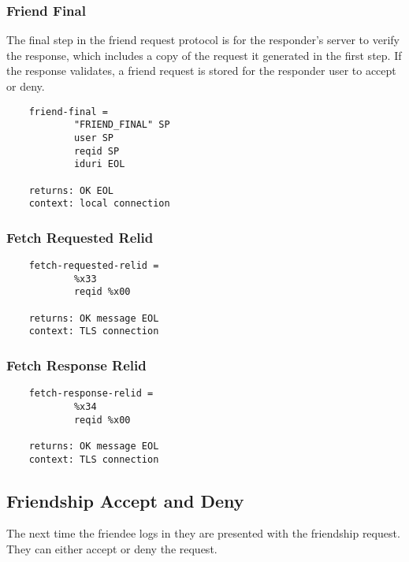 \documentclass[letterpaper,11pt,oneside]{article}
\begin{document}
\subsubsection{Friend Final}

The final step in the friend request protocol is for the responder's server to
verify the response, which includes a copy of the request it generated in the
first step. If the response validates, a friend request is stored for the
responder user to accept or deny.

\vspace{10pt}
\begin{verbatim}
    friend-final =
            "FRIEND_FINAL" SP
            user SP
            reqid SP
            iduri EOL

    returns: OK EOL
    context: local connection
\end{verbatim}
\vspace{10pt}


\subsubsection{Fetch Requested Relid}

\vspace{10pt}
\begin{verbatim}
    fetch-requested-relid = 
            %x33
            reqid %x00

    returns: OK message EOL
    context: TLS connection
\end{verbatim}
\vspace{10pt}


\subsubsection{Fetch Response Relid}

\vspace{10pt}
\begin{verbatim}
    fetch-response-relid =
            %x34
            reqid %x00

    returns: OK message EOL
    context: TLS connection
\end{verbatim}


\subsection{Friendship Accept and Deny}

The next time the friendee logs in they are presented with the friendship
request. They can either accept or deny the request. 
\end{document}
